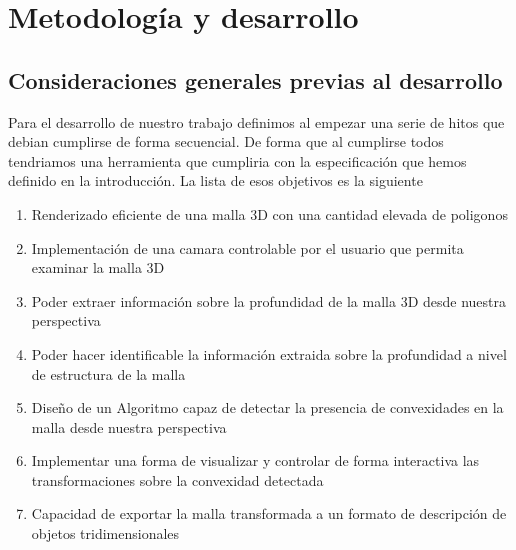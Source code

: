 \chapter{Metodología y desarrollo}

\section{Consideraciones generales previas al desarrollo}

Para el desarrollo de nuestro trabajo definimos al empezar una serie de hitos que debian cumplirse de forma secuencial. De forma que al cumplirse todos tendriamos una herramienta que cumpliria con la especificación que hemos definido en la introducción. La lista de esos objetivos es la siguiente

\begin{enumerate}
\item Renderizado eficiente de una malla 3D con una cantidad elevada de poligonos
\item Implementación de una camara controlable por el usuario que permita examinar la malla 3D
\item Poder extraer información sobre la profundidad de la malla 3D desde nuestra perspectiva
\item Poder hacer identificable la información extraida sobre la profundidad a nivel de estructura de la malla
\item Diseño de un Algoritmo capaz de detectar la presencia de convexidades en la malla desde nuestra perspectiva
\item Implementar una forma de visualizar y controlar de forma interactiva las transformaciones sobre la convexidad detectada
\item Capacidad de exportar la malla transformada a un formato de descripción de objetos tridimensionales
\end{enumerate}

